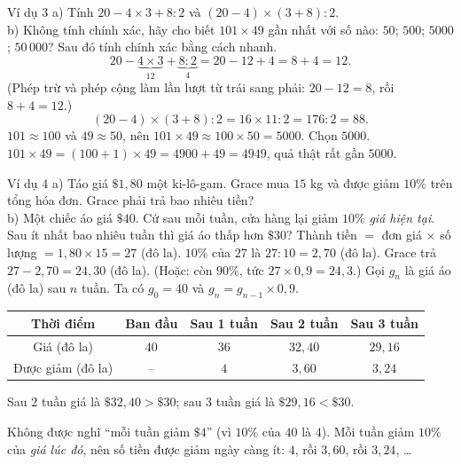 \begin{exbox}{Ví dụ 3}
a) Tính $20 - 4\times 3 + 8 : 2$ \quad và \quad $(20-4)\times(3+8) : 2$.\\
b) Không tính chính xác, hãy cho biết $101 \times 49$ gần nhất với số nào: $50$; $500$; $5000$; $50\,000$? Sau đó
tính chính xác bằng cách nhanh.
\guide
{}
\[ 20 - \underbrace{4\times 3}_{12} + \underbrace{8 : 2}_{4} = 20 - 12 + 4 = 8 + 4 = 12. \]
(Phép trừ và phép cộng làm lần lượt từ trái sang phải: $20 - 12 = 8$, rồi $8 + 4 = 12$.)
\[ (20 - 4)\times(3+8) : 2 = 16 \times 11 : 2 = 176 : 2 = 88. \]
$101 \approx 100$ và $49 \approx 50$, nên $101 \times 49 \approx 100\times 50 = 5000$. Chọn $5000$.
$101 \times 49 = (100 + 1)\times 49 = 4900 + 49 = 4949$, quả thật rất gần $5000$.
\end{exbox}

\begin{exbox}{Ví dụ 4}
a) Táo giá $\$1{,}80$ một ki-lô-gam. Grace mua $15$ kg và được giảm $10\%$ trên tổng hóa đơn. Grace phải trả
bao nhiêu tiền?\\
b) Một chiếc áo giá $\$40$. Cứ sau mỗi tuần, cửa hàng lại giảm $10\%$ \emph{giá hiện tại}. Sau ít nhất bao
nhiêu tuần thì giá áo thấp hơn $\$30$?
\guide
{}
Thành tiền $=$ đơn giá $\times$ số lượng $= 1{,}80 \times 15 = 27$ (đô la).
$10\%$ của $27$ là $27 : 10 = 2{,}70$ (đô la). Grace trả $27 - 2{,}70 = 24{,}30$ (đô la).
(Hoặc: còn $90\%$, tức $27 \times 0{,}9 = 24{,}3$.)
Gọi $g_n$ là giá áo (đô la) sau $n$ tuần. Ta có $g_0 = 40$ và $g_{n} = g_{n-1}\times 0{,}9$.
\begin{center}
\begin{tabular}{|c|c|c|c|c|}
\hline
\rowcolor{tmBlue!10} Thời điểm & Ban đầu & Sau 1 tuần & Sau 2 tuần & Sau 3 tuần\\ \hline
Giá (đô la) & $40$ & $36$ & $32{,}40$ & $29{,}16$\\ \hline
Được giảm (đô la) & -- & $4$ & $3{,}60$ & $3{,}24$\\ \hline
\end{tabular}
\end{center}
Sau $2$ tuần giá là $\$32{,}40 > \$30$; sau $3$ tuần giá là $\$29{,}16 < \$30$.
\begin{warnbox}
Không được nghĩ ``mỗi tuần giảm $\$4$'' (vì $10\%$ của $40$ là $4$). Mỗi tuần giảm $10\%$ của \emph{giá lúc đó}, nên số
tiền được giảm ngày càng ít: $4$, rồi $3{,}60$, rồi $3{,}24$, \ldots
\end{warnbox}
\end{exbox}


